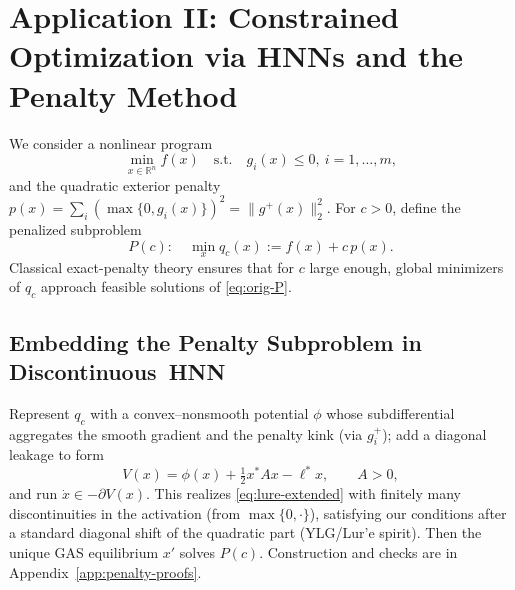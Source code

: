 \documentclass[journal]{IEEEtran}
\theoremstyle{myplain}
\begin{document}
\section{Application II: Constrained Optimization via HNNs and the Penalty Method}
\label{sec:penalty-HNN}

We consider a nonlinear program
\begin{equation}\label{eq:orig-P}
  \min_{x\in\mathbb{R}^n} f(x)\quad\text{s.t.}\quad g_i(x)\le 0,\ i=1,\dots,m,
\end{equation}
and the quadratic exterior penalty \(p(x)=\sum_i (\max\{0,g_i(x)\})^2=\|g^+(x)\|_2^2\).
For \(c>0\), define the penalized subproblem
\begin{equation}\label{eq:penalty-Pc}
  P(c):\quad \min_{x} q_c(x):=f(x)+c\,p(x).
\end{equation}
Classical exact-penalty theory ensures that for \(c\) large enough, global minimizers of \(q_c\) approach feasible solutions of \eqref{eq:orig-P}.

\subsection{Embedding the Penalty Subproblem in Discontinuous~HNN}
Represent \(q_c\) with a convex–nonsmooth potential \(\phi\) whose subdifferential aggregates the smooth gradient and the penalty kink (via \(g_i^+\)); add a diagonal leakage to form
\begin{equation}\label{eq:penalty-V}
  V(x)=\phi(x)+\tfrac12 x^* A x - \ell^* x,\qquad A>0,
\end{equation}
and run \(\dot x\in -\partial V(x)\). This realizes \eqref{eq:lure-extended}
with finitely many discontinuities in the activation (from \(\max\{0,\cdot\}\)), 
satisfying our conditions after a standard diagonal shift of the quadratic part (YLG/Lur’e spirit). 
Then the unique GAS equilibrium \(x'\) solves \(P(c)\). 
Construction and checks are in Appendix~\ref{app:penalty-proofs}.
\end{document}
